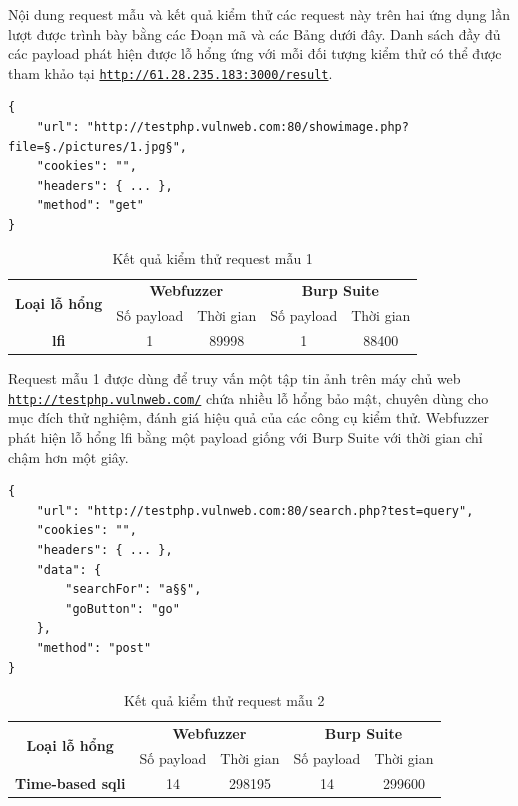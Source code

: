 \FloatBarrier
Nội dung request mẫu và kết quả kiểm thử các request này trên hai ứng dụng lần lượt được trình bày bằng các Đoạn mã và các Bảng dưới đây. Danh sách đầy đủ các payload phát hiện được lỗ hổng ứng với mỗi đối tượng kiểm thử có thể được tham khảo tại \href{http://61.28.235.183:3000/result}{\texttt{http://61.28.235.183:3000/result}}.\par
\begin{lstlisting}[style=ES6, label={lst:base-request-1}, caption={Request mẫu 1 có lỗ hổng \acrshort{lfi}}]
{
    "url": "http://testphp.vulnweb.com:80/showimage.php?file=§./pictures/1.jpg§",
    "cookies": "",
    "headers": { ... },
    "method": "get"
}
\end{lstlisting}
\FloatBarrier
\begin{table}[ht]
    \centering
    \caption{Kết quả kiểm thử request mẫu 1}
    \label{tab:testing-result-1}
    \begin{tabular}[ht]{ccccc}
        \toprule[1pt]\midrule[0.3pt]
            \multirow{2}{*}{\textbf{Loại lỗ hổng}}&\multicolumn{2}{c}{\textbf{Webfuzzer}}&\multicolumn{2}{c}{\textbf{Burp Suite}}\\
            \cmidrule(lr){2-3}\cmidrule(lr){4-5}{}&Số payload&Thời gian&Số payload&Thời gian\\
        \midrule[0.3pt]
            \textbf{\acrshort{lfi}}&1&89998&1&88400\\
        \midrule[0.3pt]\bottomrule[1pt]
    \end{tabular}
\end{table}
\FloatBarrier
Request mẫu 1 được dùng để truy vấn một tập tin ảnh trên máy chủ web\\\href{http://testphp.vulnweb.com/}{\texttt{http://testphp.vulnweb.com/}} chứa nhiều lỗ hổng bảo mật, chuyên dùng cho mục đích thử nghiệm, đánh giá hiệu quả của các công cụ kiểm thử. Webfuzzer phát hiện lỗ hổng \acrshort{lfi} bằng một payload giống với Burp Suite với thời gian chỉ chậm hơn một giây.
\begin{lstlisting}[style=ES6, label={lst:base-request-2}, caption={Request mẫu 2 có lỗ hổng time-based \acrshort{sqli}}]
{
    "url": "http://testphp.vulnweb.com:80/search.php?test=query",
    "cookies": "",
    "headers": { ... },
    "data": {
        "searchFor": "a§§",
        "goButton": "go"
    },
    "method": "post"
}
\end{lstlisting}
\FloatBarrier
\begin{table}[ht]
    \centering
    \caption{Kết quả kiểm thử request mẫu 2}
    \label{tab:testing-result-2}
    \begin{tabular}[ht]{ccccc}
        \toprule[1pt]\midrule[0.3pt]
            \multirow{2}{*}{\textbf{Loại lỗ hổng}}&\multicolumn{2}{c}{\textbf{Webfuzzer}}&\multicolumn{2}{c}{\textbf{Burp Suite}}\\
            \cmidrule(lr){2-3}\cmidrule(lr){4-5}{}&Số payload&Thời gian&Số payload&Thời gian\\
        \midrule[0.3pt]
            \textbf{Time-based \acrshort{sqli}}&14&298195&14&299600\\
        \midrule[0.3pt]\bottomrule[1pt]
    \end{tabular}
\end{table}
